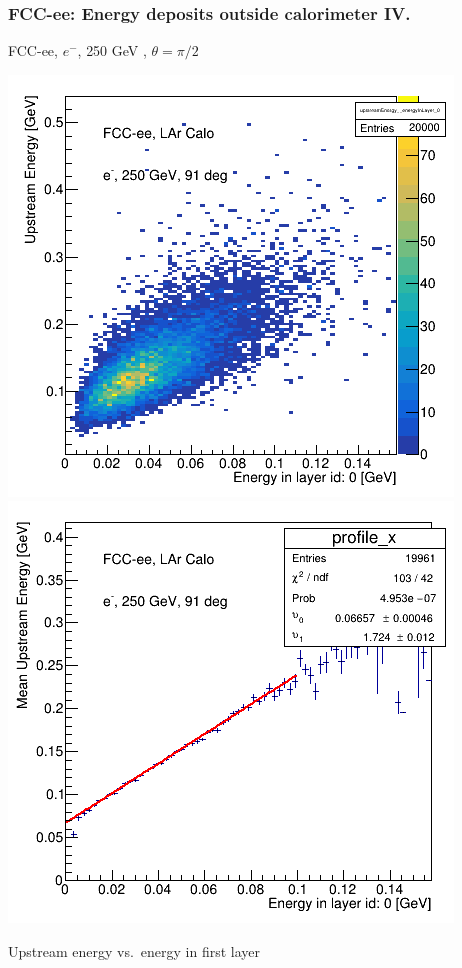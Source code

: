 \documentclass[aspectratio=169]{beamer}
\newcommand{\redtext}[1]{%
  \textcolor{myRed}{#1}
}
\begin{document}
\begin{frame}
  \frametitle{FCC-ee: Energy deposits outside calorimeter IV.}

  \centering
  FCC-ee, $e^{-}$, \redtext{250 GeV}, $\theta = \pi/2$ \\[1.5ex]
  \begin{adjustwidth}{-9mm}{-9mm}
    \includegraphics[width=0.49\linewidth]{figures/12layers/hist_upstream_vs_layer_0_91deg_250GeV.png}
    \includegraphics[width=0.49\linewidth]{figures/12layers/profile_upstream_vs_layer_0_91deg_250GeV.png}
  \end{adjustwidth}
  \redtext{Upstream} energy vs.\ energy in first layer
\end{frame}
\end{document}
